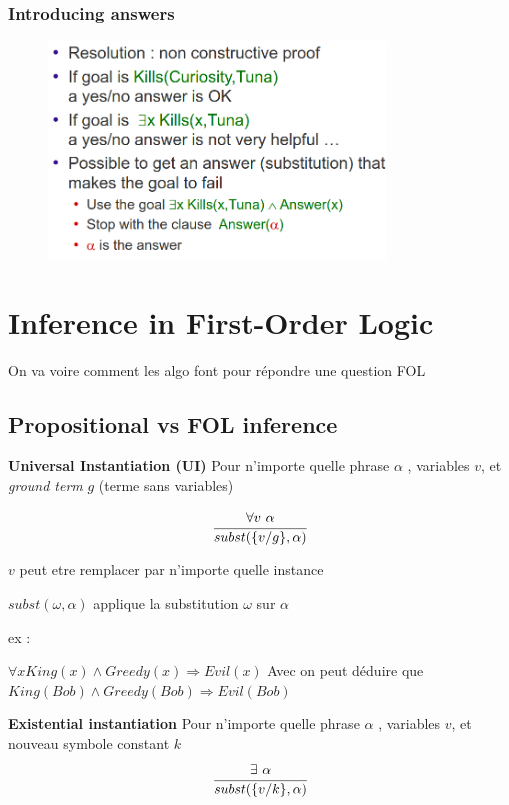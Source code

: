 		\subsubsection{Introducing answers}
		
			\begin{figure}[htp]	
				\centering
				\includegraphics[width=0.8\textwidth]{img/RIR2.png}
			\end{figure}\section{Inference in First-Order Logic}
	On va voire comment les algo font pour répondre une question FOL
	\subsection{Propositional vs FOL inference}
		\textbf{Universal Instantiation (UI)} Pour n'importe quelle phrase $\alpha$ , variables $v$, et \textit{ground term} $g$ (terme sans variables)
		
		\begin{equation}
			\cfrac{\forall v \ \alpha}{subst(\{v/g\}, \alpha)}
		\end{equation}
		
		$v$ peut etre remplacer par n'importe quelle instance

		$subst(\omega,\alpha)$ applique la substitution $\omega$ sur $\alpha$
		
		ex : 
		
		$\forall x King(x) \land Greedy(x) \Rightarrow Evil(x)$ Avec on peut déduire que $King(Bob) \land Greedy(Bob) \Rightarrow Evil(Bob)$
		
		\textbf{Existential instantiation}
		Pour n'importe quelle phrase $\alpha$ , variables $v$, et nouveau symbole constant $k$
			\begin{equation}
				\cfrac{\exists \ \alpha}{subst(\{v/k\}, \alpha)}
			\end{equation}
		
